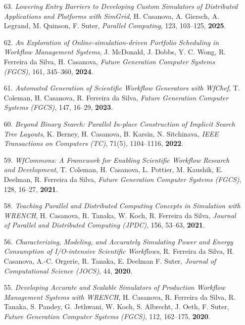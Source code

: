
\begin{enumerate}

% 
\item [63.] {\it Lowering Entry Barriers to Developing Custom Simulators of Distributed Applications and Platforms with SimGrid}, H. Casanova, A. Giersch, A. Legrand, M. Quinson, F. Suter, \emph{Parallel Computing}, 123, 103--125, {\bf 2025}.

\item [62.] {\it An Exploration of Online-simulation-driven Portfolio Scheduling in Workflow Management Systems}, J. McDonald, J. Dobbs, Y. C. Wong, R. Ferreira da Silva, H. Casanova, \emph{Future Generation Computer Systems (FGCS)}, 161, 345--360, {\bf 2024}.

\item [61.] {\it Automated Generation of Scientific Workflow Generators with WfChef}, T. Coleman, H. Casanova, R. Ferreira da Silva, \emph{Future Generation Computer Systems (FGCS)}, 147, 16--29, {\bf 2023}.

\item [60.] {\it Beyond Binary Search: Parallel In-place Construction of Implicit Search Tree Layouts}, K. Berney, H. Casanova, B. Karsin, N. Sitchinava, \emph{IEEE Transactions on Computers (TC)}, 71(5), 1104--1116, {\bf 2022}.

\item [59.] {\it WfCommons: A Framework for Enabling Scientific Workflow Research and Development}, T. Coleman, H. Casanova, L. Pottier, M. Kaushik, E. Deelman, R. Ferreira da Silva, \emph{Future Generation Computer Systems (FGCS)}, 128, 16--27, {\bf 2021}.

\item [58.] {\it Teaching Parallel and Distributed Computing Concepts in Simulation with WRENCH}, H. Casanova, R. Tanaka, W. Koch, R. Ferreira da Silva, \emph{Journal of Parallel and Distributed Computing (JPDC)}, 156, 53--63, {\bf 2021}.

\item [56.] {\it Characterizing, Modeling, and Accurately Simulating Power and Energy Consumption of I/O-intensive Scientific Workflows}, R. Ferreira da Silva, H. Casanova, A.-C. Orgerie, R. Tanaka, E. Deelman F. Suter, \emph{Journal of Computational Science (JOCS)}, 44, {\bf 2020}.

\item [55.] {\it Developing Accurate and Scalable Simulators of Production
Workflow Management Systems with WRENCH}, H. Casanova, R. Ferreira da
Silva, R. Tanaka, S. Pandey, G. Jethwani, W. Koch, S. Albrecht, J. Oeth, F.
        Suter, \emph{Future Generation Computer Systems (FGCS)}, 112, 162--175,
{\bf 2020}.


\end{enumerate}
